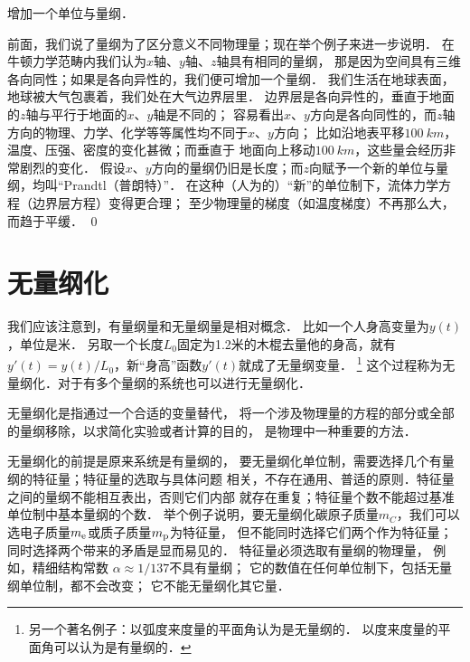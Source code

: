 \begin{example}
    增加一个单位与量纲．
\end{example}

前面，我们说了量纲为了区分意义不同物理量；现在举个例子来进一步说明．
在牛顿力学范畴内我们认为$x$轴、$y$轴、$z$轴具有相同的量纲，
那是因为空间具有三维各向同性；如果是各向异性的，我们便可增加一个量纲．
我们生活在地球表面，地球被大气包裹着，我们处在大气边界层里．
边界层是各向异性的，垂直于地面的$z$轴与平行于地面的$x$、$y$轴是不同的；
容易看出$x$、$y$方向是各向同性的，而$z$轴方向的物理、力学、化学等等属性均不同于$x$、$y$方向；
比如沿地表平移$\SI{100}{km}$，温度、压强、密度的变化甚微；而垂直于
地面向上移动$\SI{100}{km}$，这些量会经历非常剧烈的变化．
假设$x$、$y$方向的量纲仍旧是长度；而$z$向赋予一个新的单位与量纲，均叫“Prandtl（普朗特）”．
在这种（人为的）“新”的单位制下，流体力学方程（边界层方程）变得更合理；
至少物理量的梯度（如温度梯度）不再那么大，而趋于平缓．
\qed


\section{无量纲化}
我们应该注意到，有量纲量和无量纲量是相对概念．
比如一个人身高变量为$y(t)$，单位是米．
另取一个长度$L_0$固定为1.2米的木棍去量他的身高，就有
$y'(t)=y(t)/L_0$，新“身高”函数$y'(t)$就成了无量纲变量．
{\footnote{另一个著名例子：以{\kaishu 弧度}来度量的平面角认为是无量纲的．
以{\kaishu 度}来度量的平面角可以认为是有量纲的．}}
这个过程称为无量纲化．对于有多个量纲的系统也可以进行无量纲化．

无量纲化是指通过一个合适的变量替代，
将一个涉及物理量的方程的部分或全部的量纲移除，以求简化实验或者计算的目的，
是物理中一种重要的方法．

无量纲化的前提是原来系统是有量纲的，
要无量纲化单位制，需要选择几个有量纲的{\kaishu 特征量}；特征量的选取与具体问题
相关，不存在通用、普适的原则．特征量之间的量纲不能相互表出，否则它们内部
就存在重复；特征量个数不能超过基准单位制中基本量纲的个数．
举个例子说明，要无量纲化碳原子质量$m_C$，我们可以选电子质量$m_{\rm e}$或质子质量$m_{\rm p}$为特征量，
但不能同时选择它们两个作为特征量；同时选择两个带来的矛盾是显而易见的．
特征量必须选取有量纲的物理量，
例如，精细结构常数 $\alpha\approx 1/137$不具有量纲；
它的数值在任何单位制下，包括无量纲单位制，都不会改变；
它不能无量纲化其它量．



